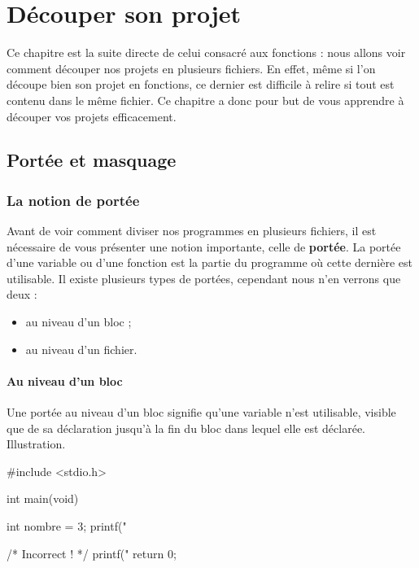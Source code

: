 \chapter{Découper son projet}
\label{decouper-son-projet }

Ce chapitre est la suite directe de celui consacré aux fonctions : nous allons voir comment découper nos
projets en plusieurs fichiers. En effet, même si l'on découpe bien son
projet en fonctions, ce dernier est difficile à relire si tout est
contenu dans le même fichier. Ce chapitre a donc pour but de vous
apprendre à découper vos projets efficacement.

\section{Portée et masquage}
\label{portee-et-masquage}

\subsection{La notion de portée}
\label{la-notion-de-portee}

Avant de voir comment diviser nos programmes en plusieurs fichiers, il
est nécessaire de vous présenter une notion importante, celle de
\textbf{portée}. La portée d'une variable ou d'une fonction est la
partie du programme où cette dernière est utilisable. Il existe
plusieurs types de portées, cependant nous n'en verrons que deux :

\begin{itemize}
\item
  au niveau d'un bloc ;
\item
  au niveau d'un fichier.
\end{itemize}

\subsubsection{Au niveau d'un bloc}
\label{au-niveau-dun-bloc}

Une portée au niveau d'un bloc signifie qu'une variable n'est
utilisable, visible que de sa déclaration jusqu'à la fin du bloc dans
lequel elle est déclarée. Illustration.

\begin{C}
#include <stdio.h>

int main(void)
{
    {
        int nombre = 3;
        printf("%
    }

    /* Incorrect ! */
    printf("%
    return 0;
}
\end{C}

